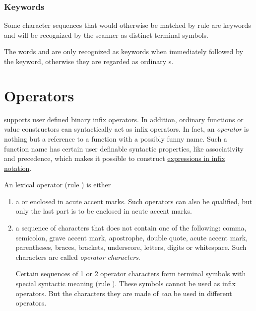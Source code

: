 \subsubsection{Keywords}

Some character sequences that would otherwise be matched by rule  are keywords and will be recognized by the scanner as distinct terminal symbols.

\begin{flushleft}
\label{keyword} 
\end{flushleft}

The words  and  are only recognized as keywords when immediately followed by the 
 keyword, otherwise they are regarded as ordinary s.

\section{Operators} \label{operator}   \label{fixity} 

\frege{} supports user defined binary infix operators. In addition, ordinary functions or value constructors can syntactically act as infix operators. In fact, an \emph{operator} is nothing but a reference to a function with a possibly funny name. Such a function name has certain user definable syntactic properties, like associativity and precedence, which makes it possible to construct \hyperref[binex]{expressions in infix notation}.

An lexical operator (rule ) is either

\begin{enumerate}
	\item a  or  enclosed in acute accent marks. Such operators can also be qualified, but only the last part is to be enclosed in acute accent marks.
	\item a sequence of characters that does not contain one of the following: comma, semicolon, 
	grave accent mark, apostrophe, double quote, acute accent mark,
	parentheses, braces, brackets, underscore, letters, digits or whitespace. Such characters are called \emph{operator characters}.
	
	Certain sequences of 1 or 2 operator characters form
	terminal symbols with special syntactic meaning
	(rule ). These symbols cannot be used as infix operators. But the characters they are made of \emph{can} be used in different operators.
\end{enumerate}

